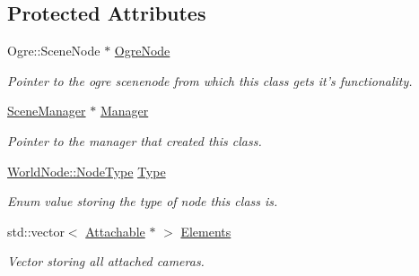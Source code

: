\subsection*{Protected Attributes}
\begin{DoxyCompactItemize}
\item 
\hypertarget{classphys_1_1WorldNode_abc3e4ddcd1dc2f15ffa40ed2d18b5fd8}{
Ogre::SceneNode $\ast$ \hyperlink{classphys_1_1WorldNode_abc3e4ddcd1dc2f15ffa40ed2d18b5fd8}{OgreNode}}
\label{d2/d3e/classphys_1_1WorldNode_abc3e4ddcd1dc2f15ffa40ed2d18b5fd8}

\begin{DoxyCompactList}\small\item\em Pointer to the ogre scenenode from which this class gets it's functionality. \item\end{DoxyCompactList}\item 
\hypertarget{classphys_1_1WorldNode_a070f1686f70880dac0241c96518c7a8a}{
\hyperlink{classphys_1_1SceneManager}{SceneManager} $\ast$ \hyperlink{classphys_1_1WorldNode_a070f1686f70880dac0241c96518c7a8a}{Manager}}
\label{d2/d3e/classphys_1_1WorldNode_a070f1686f70880dac0241c96518c7a8a}

\begin{DoxyCompactList}\small\item\em Pointer to the manager that created this class. \item\end{DoxyCompactList}\item 
\hypertarget{classphys_1_1WorldNode_aef2329f38799c3d67f1f1f69b35dda20}{
\hyperlink{classphys_1_1WorldNode_a0b178b06aa411b00c4c2ccd926d9bf5a}{WorldNode::NodeType} \hyperlink{classphys_1_1WorldNode_aef2329f38799c3d67f1f1f69b35dda20}{Type}}
\label{d2/d3e/classphys_1_1WorldNode_aef2329f38799c3d67f1f1f69b35dda20}

\begin{DoxyCompactList}\small\item\em Enum value storing the type of node this class is. \item\end{DoxyCompactList}\item 
\hypertarget{classphys_1_1WorldNode_a2a17c53f3a7ad3d5bd322855096fcbc3}{
std::vector$<$ \hyperlink{classphys_1_1Attachable}{Attachable} $\ast$ $>$ \hyperlink{classphys_1_1WorldNode_a2a17c53f3a7ad3d5bd322855096fcbc3}{Elements}}
\label{d2/d3e/classphys_1_1WorldNode_a2a17c53f3a7ad3d5bd322855096fcbc3}

\begin{DoxyCompactList}\small\item\em Vector storing all attached cameras. \item\end{DoxyCompactList}\end{DoxyCompactItemize}



